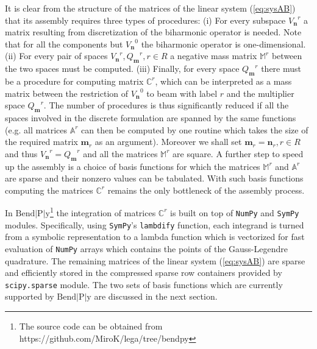\documentclass{marine_2015}
\newcommand{\Vh}{\ensuremath{V_{\mathbf{n}}}}
\newcommand{\Qh}{\ensuremath{Q_{\mathbf{m}}}}
\begin{document}
It is clear from the structure of the matrices of the linear system
(\ref{eq:sysAB}) that its assembly requires three types of procedures: (i) For 
every subspace $\Vh^r$ a matrix resulting from discretization of the biharmonic operator is needed.
Note that for all the components but $\Vh^0$ the biharmonic operator is one-dimensional. 
(ii) For every pair of spaces $\Vh^r, \Qh^r, r\in R$ a negative mass
matrix $\mathbb{M}^r$ between the two spaces must be computed. (iii) Finally, for
every space $\Qh^r$ there must be a procedure for computing matrix $\mathbb{C}^r$,
which can be interpreted as a mass matrix between the restriction of $\Vh^0$ to
beam with label $r$ and the multiplier space $\Qh^r$. The number of procedures is 
thus significantly reduced if all the spaces involved in the discrete formulation 
are spanned by the same functions (e.g. all matrices $\mathbb{A}^r$ can then be
computed by one routine which takes the size of the required matrix $\mathbf{m}_r$ as an
argument). Moreover we shall set $\mathbf{m}_r=\mathbf{n}_r, r\in R$
and thus $\Vh^r=\Qh^r$ and all the matrices $\mathbb{M}^r$ are square. A further 
step to speed up the assembly is a choice of basis functions for which the matrices 
$\mathbb{M}^r$ and $\mathbb{A}^r$ are sparse and their nonzero values can be tabulated. With such basis functions 
computing the matrices $\mathbb{C}^r$ remains the only bottleneck of the assembly 
process. 

In $\text{Bend}\!\left|\text{P}\right|\!\text{y}$\footnote{The source code
can be obtained from https://github.com/MiroK/lega/tree/bendpy} the integration of matrices $\mathbb{C}^r$ is built on top of
{\tt{NumPy}}\cite{numpy} and {\tt{SymPy}}\cite{sympy} modules. Specifically, using
{\tt{SymPy}}'s {\tt{lambdify}} function, each integrand is turned from a symbolic 
representation to a lambda function which is vectorized for fast evaluation of 
{\tt{NumPy}} arrays which contains the points of the Gauss-Legendre quadrature. 
The remaining matrices of the linear system (\ref{eq:sysAB}) are sparse and 
efficiently stored in the compressed sparse row containers provided by {\tt{scipy.sparse}} module.
The two sets of basis functions which are currently supported by $\text{Bend}\!\left|\text{P}\right|\!\text{y}$
are discussed in the next section.
\end{document}

